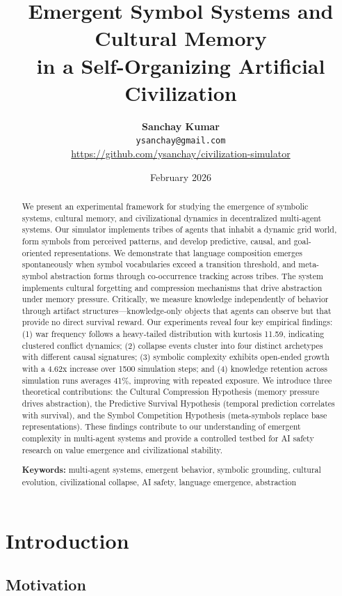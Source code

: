 \documentclass[11pt,a4paper]{article}
\title{\textbf{Emergent Symbol Systems and Cultural Memory\\in a Self-Organizing Artificial Civilization}}
\author{
    \textbf{Sanchay Kumar}\\
    \texttt{ysanchay@gmail.com}\\
    \url{https://github.com/ysanchay/civilization-simulator}
}
\date{February 2026}
\begin{document}
\maketitle

\begin{abstract}
We present an experimental framework for studying the emergence of symbolic systems, cultural memory, and civilizational dynamics in decentralized multi-agent systems. Our simulator implements tribes of agents that inhabit a dynamic grid world, form symbols from perceived patterns, and develop predictive, causal, and goal-oriented representations. We demonstrate that language composition emerges spontaneously when symbol vocabularies exceed a transition threshold, and meta-symbol abstraction forms through co-occurrence tracking across tribes. The system implements cultural forgetting and compression mechanisms that drive abstraction under memory pressure. Critically, we measure knowledge independently of behavior through artifact structures—knowledge-only objects that agents can observe but that provide no direct survival reward. Our experiments reveal four key empirical findings: (1) war frequency follows a heavy-tailed distribution with kurtosis 11.59, indicating clustered conflict dynamics; (2) collapse events cluster into four distinct archetypes with different causal signatures; (3) symbolic complexity exhibits open-ended growth with a 4.62x increase over 1500 simulation steps; and (4) knowledge retention across simulation runs averages 41\%, improving with repeated exposure. We introduce three theoretical contributions: the Cultural Compression Hypothesis (memory pressure drives abstraction), the Predictive Survival Hypothesis (temporal prediction correlates with survival), and the Symbol Competition Hypothesis (meta-symbols replace base representations). These findings contribute to our understanding of emergent complexity in multi-agent systems and provide a controlled testbed for AI safety research on value emergence and civilizational stability.

\textbf{Keywords:} multi-agent systems, emergent behavior, symbolic grounding, cultural evolution, civilizational collapse, AI safety, language emergence, abstraction
\end{abstract}

\section{Introduction}

\subsection{Motivation}
\end{document}
